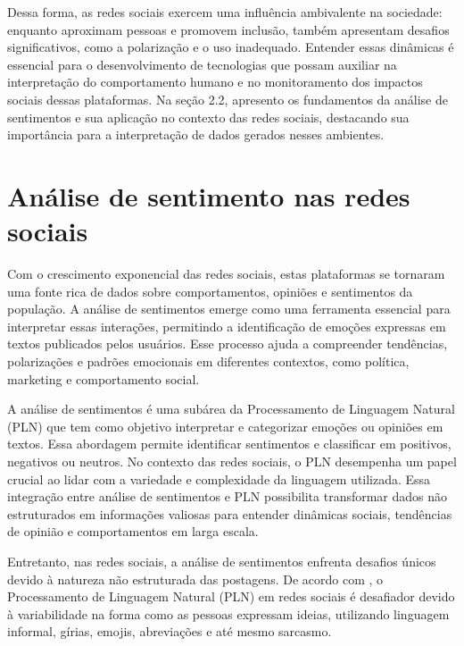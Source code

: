 \documentclass[
	12pt,				%
	oneside,			%
	a4paper,			%
	english,			%
	french,				%
	spanish,			%
	brazil				%
	]{abntex2}
\begin{document}
Dessa forma, as redes sociais exercem uma influência ambivalente na
sociedade: enquanto aproximam pessoas e promovem inclusão, também
apresentam desafios significativos, como a polarização e o uso
inadequado. Entender essas dinâmicas é essencial para o desenvolvimento
de tecnologias que possam auxiliar na interpretação do comportamento
humano e no monitoramento dos impactos sociais dessas plataformas. Na
seção 2.2, apresento os fundamentos da análise de sentimentos e sua
aplicação no contexto das redes sociais, destacando sua importância para
a interpretação de dados gerados nesses ambientes.

\hypertarget{anuxe1lise-de-sentimento-nas-redes-sociais}{%
\section{Análise de sentimento nas redes
sociais}\label{anuxe1lise-de-sentimento-nas-redes-sociais}}

Com o crescimento exponencial das redes sociais, estas plataformas se
tornaram uma fonte rica de dados sobre comportamentos, opiniões e
sentimentos da população. A análise de sentimentos emerge como uma
ferramenta essencial para interpretar essas interações, permitindo a
identificação de emoções expressas em textos publicados pelos usuários.
Esse processo ajuda a compreender tendências, polarizações e padrões
emocionais em diferentes contextos, como política, marketing e
comportamento social.

A análise de sentimentos é uma subárea da Processamento de Linguagem
Natural (PLN) que tem como objetivo interpretar e categorizar emoções ou
opiniões em textos. Essa abordagem permite identificar sentimentos e
classificar em positivos, negativos ou neutros. No contexto das redes
sociais, o PLN desempenha um papel crucial ao lidar com a variedade e
complexidade da linguagem utilizada. Essa integração entre análise de
sentimentos e PLN possibilita transformar dados não estruturados em
informações valiosas para entender dinâmicas sociais, tendências de
opinião e comportamentos em larga escala.

Entretanto, nas redes sociais, a análise de sentimentos enfrenta
desafios únicos devido à natureza não estruturada das postagens. De
acordo com , o Processamento de
Linguagem Natural (PLN) em redes sociais é desafiador devido à
variabilidade na forma como as pessoas expressam ideias, utilizando
linguagem informal, gírias, emojis, abreviações e até mesmo sarcasmo.
\end{document}
